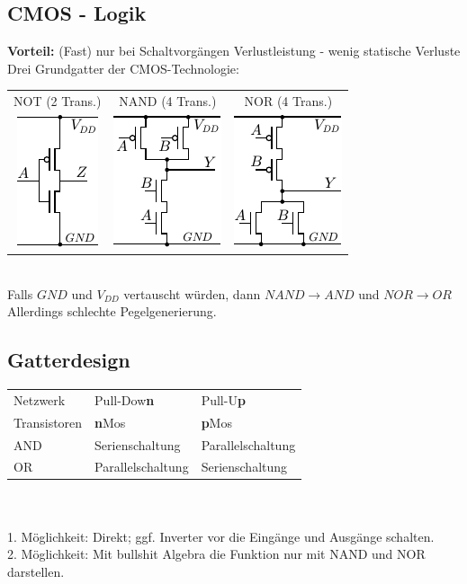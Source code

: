 \documentclass[6pt,a4paper]{scrartcl}
\renewcommand{\emph}[1]{\textsf{\textbf{#1}}}
\newcommand{\ra}[0]{\ensuremath{\rightarrow}} 									%
\begin{document}
\begin{multicols*}{3}
\section{CMOS - Logik}
	\emph{Vorteil:}	 (Fast) nur bei Schaltvorgängen Verlustleistung - wenig statische Verluste \\
Drei Grundgatter der CMOS-Technologie:\\
	\begin{tabular}{ccc}
		NOT (2 Trans.) & NAND (4 Trans.) & NOR (4 Trans.)\\
		\includegraphics{./img/ds/mosfet_not.pdf} \qquad & \includegraphics{./img/ds/mosfet_nand.pdf} \qquad & \includegraphics{./img/ds/mosfet_nor.pdf} \\
	\end{tabular}\\
	Falls $GND$ und $V_{DD}$ vertauscht würden, dann $NAND \ra AND$ und $NOR \ra OR$\\
	Allerdings schlechte Pegelgenerierung.
	
	\subsection{Gatterdesign}
	\begin{tabular}{l|l|l}
		Netzwerk & Pull-Dow\bf{n} & Pull-U\bf{p} \\
		Transistoren & \textbf{n}Mos & \textbf{p}Mos \\ \hline
		AND & Serienschaltung	 & Parallelschaltung \\
		OR & Parallelschaltung & Serienschaltung \\
	\end{tabular}\\ \\
	1. Möglichkeit: Direkt; ggf. Inverter vor die Eingänge und Ausgänge schalten.\\
	2. Möglichkeit: Mit bullshit Algebra die Funktion nur mit NAND und NOR darstellen.
	

\end{multicols*}
\end{document}
